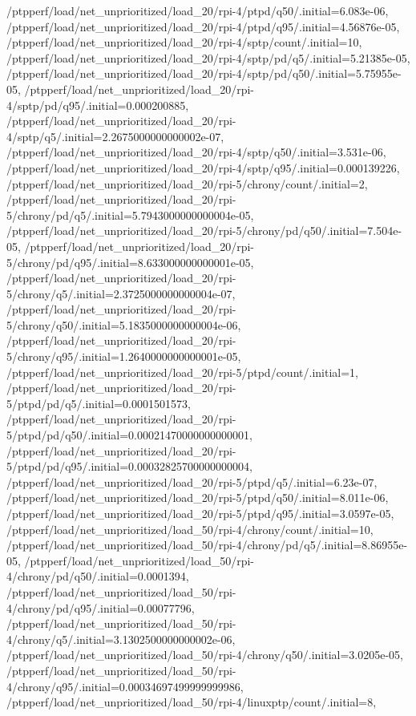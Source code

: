 {    /ptpperf/load/net_unprioritized/load_20/rpi-4/ptpd/q50/.initial=6.083e-06,
    /ptpperf/load/net_unprioritized/load_20/rpi-4/ptpd/q95/.initial=4.56876e-05,
    /ptpperf/load/net_unprioritized/load_20/rpi-4/sptp/count/.initial=10,
    /ptpperf/load/net_unprioritized/load_20/rpi-4/sptp/pd/q5/.initial=5.21385e-05,
    /ptpperf/load/net_unprioritized/load_20/rpi-4/sptp/pd/q50/.initial=5.75955e-05,
    /ptpperf/load/net_unprioritized/load_20/rpi-4/sptp/pd/q95/.initial=0.000200885,
    /ptpperf/load/net_unprioritized/load_20/rpi-4/sptp/q5/.initial=2.2675000000000002e-07,
    /ptpperf/load/net_unprioritized/load_20/rpi-4/sptp/q50/.initial=3.531e-06,
    /ptpperf/load/net_unprioritized/load_20/rpi-4/sptp/q95/.initial=0.000139226,
    /ptpperf/load/net_unprioritized/load_20/rpi-5/chrony/count/.initial=2,
    /ptpperf/load/net_unprioritized/load_20/rpi-5/chrony/pd/q5/.initial=5.7943000000000004e-05,
    /ptpperf/load/net_unprioritized/load_20/rpi-5/chrony/pd/q50/.initial=7.504e-05,
    /ptpperf/load/net_unprioritized/load_20/rpi-5/chrony/pd/q95/.initial=8.633000000000001e-05,
    /ptpperf/load/net_unprioritized/load_20/rpi-5/chrony/q5/.initial=2.3725000000000004e-07,
    /ptpperf/load/net_unprioritized/load_20/rpi-5/chrony/q50/.initial=5.1835000000000004e-06,
    /ptpperf/load/net_unprioritized/load_20/rpi-5/chrony/q95/.initial=1.2640000000000001e-05,
    /ptpperf/load/net_unprioritized/load_20/rpi-5/ptpd/count/.initial=1,
    /ptpperf/load/net_unprioritized/load_20/rpi-5/ptpd/pd/q5/.initial=0.0001501573,
    /ptpperf/load/net_unprioritized/load_20/rpi-5/ptpd/pd/q50/.initial=0.00021470000000000001,
    /ptpperf/load/net_unprioritized/load_20/rpi-5/ptpd/pd/q95/.initial=0.00032825700000000004,
    /ptpperf/load/net_unprioritized/load_20/rpi-5/ptpd/q5/.initial=6.23e-07,
    /ptpperf/load/net_unprioritized/load_20/rpi-5/ptpd/q50/.initial=8.011e-06,
    /ptpperf/load/net_unprioritized/load_20/rpi-5/ptpd/q95/.initial=3.0597e-05,
    /ptpperf/load/net_unprioritized/load_50/rpi-4/chrony/count/.initial=10,
    /ptpperf/load/net_unprioritized/load_50/rpi-4/chrony/pd/q5/.initial=8.86955e-05,
    /ptpperf/load/net_unprioritized/load_50/rpi-4/chrony/pd/q50/.initial=0.0001394,
    /ptpperf/load/net_unprioritized/load_50/rpi-4/chrony/pd/q95/.initial=0.00077796,
    /ptpperf/load/net_unprioritized/load_50/rpi-4/chrony/q5/.initial=3.1302500000000002e-06,
    /ptpperf/load/net_unprioritized/load_50/rpi-4/chrony/q50/.initial=3.0205e-05,
    /ptpperf/load/net_unprioritized/load_50/rpi-4/chrony/q95/.initial=0.00034697499999999986,
    /ptpperf/load/net_unprioritized/load_50/rpi-4/linuxptp/count/.initial=8,
}
